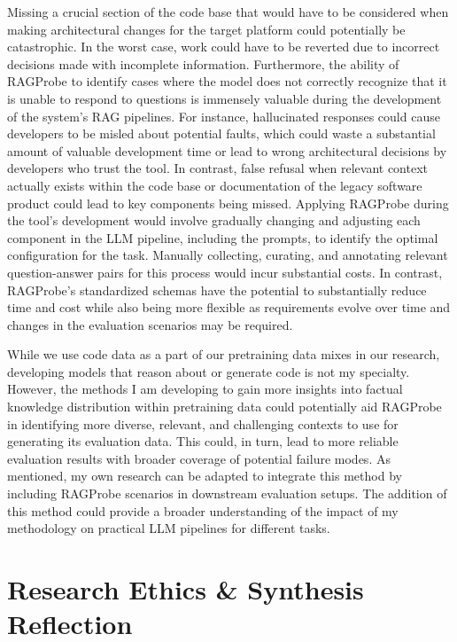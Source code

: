 \documentclass[11pt]{article}
\begin{document}
Missing a crucial section of the code base that would have to be considered when making architectural changes for the target platform could potentially be catastrophic. In the worst case, work could have to be reverted due to incorrect decisions made with incomplete information. Furthermore, the ability of RAGProbe to identify cases where the model does not correctly recognize that it is unable to respond to questions is immensely valuable during the development of the system's RAG pipelines. For instance, hallucinated responses could cause developers to be misled about potential faults, which could waste a substantial amount of valuable development time or lead to wrong architectural decisions by developers who trust the tool. In contrast, false refusal when relevant context actually exists within the code base or documentation of the legacy software product could lead to key components being missed. Applying RAGProbe during the tool's development would involve gradually changing and adjusting each component in the LLM pipeline, including the prompts, to identify the optimal configuration for the task. Manually collecting, curating, and annotating relevant question-answer pairs for this process would incur substantial costs. In contrast, RAGProbe's standardized schemas have the potential to substantially reduce time and cost while also being more flexible as requirements evolve over time and changes in the evaluation scenarios may be required.

While we use code data as a part of our pretraining data mixes in our research, developing models that reason about or generate code is not my specialty. However, the methods I am developing to gain more insights into factual knowledge distribution within pretraining data could potentially aid RAGProbe in identifying more diverse, relevant, and challenging contexts to use for generating its evaluation data. This could, in turn, lead to more reliable evaluation results with broader coverage of potential failure modes. As mentioned, my own research can be adapted to integrate this method by including RAGProbe scenarios in downstream evaluation setups. The addition of this method could provide a broader understanding of the impact of my methodology on practical LLM pipelines for different tasks.

\section{Research Ethics \& Synthesis Reflection}
\end{document}
